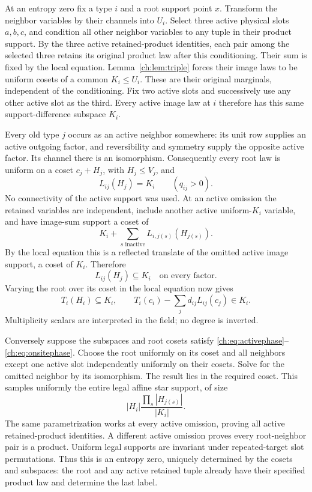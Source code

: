 At an entropy zero fix a type $i$ and a root support point $x$. Transform the neighbor variables by their channels into $U_i$. Select three active physical slots $a,b,c$, and condition all other neighbor variables to any tuple in their product support. By the three active retained-product identities, each pair among the selected three retains its original product law after this conditioning. Their sum is fixed by the local equation. Lemma~\ref{ch:lem:triple} forces their image laws to be uniform cosets of a common $K_i\le U_i$. These are their original marginals, independent of the conditioning. Fix two active slots and successively use any other active slot as the third. Every active image law at $i$ therefore has this same support-difference subspace $K_i$.

Every old type $j$ occurs as an active neighbor somewhere: its unit row supplies an active outgoing factor, and reversibility and symmetry supply the opposite active factor. Its channel there is an isomorphism. Consequently every root law is uniform on a coset $c_j+H_j$, with $H_j\le V_j$, and
\begin{equation}\label{ch:eq:activephase}
 L_{ij}(H_j)=K_i\qquad(q_{ij}>0).
\end{equation}
No connectivity of the active support was used. At an active omission the retained variables are independent, include another active uniform-$K_i$ variable, and have image-sum support a coset of
\[
 K_i+\sum_{s\text{ inactive}}L_{i,j(s)}(H_{j(s)}).
\]
By the local equation this is a reflected translate of the omitted active image support, a coset of $K_i$. Therefore
\begin{equation}\label{ch:eq:inactivephase}
 L_{ij}(H_j)\subseteq K_i\quad\text{on every factor}.
\end{equation}
Varying the root over its coset in the local equation now gives
\begin{equation}\label{ch:eq:onsitephase}
 T_i(H_i)\subseteq K_i,\qquad
 T_i(c_i)-\sum_jd_{ij}L_{ij}(c_j)\in K_i.
\end{equation}
Multiplicity scalars are interpreted in the field; no degree is inverted.

Conversely suppose the subspaces and root cosets satisfy \eqref{ch:eq:activephase}--\eqref{ch:eq:onsitephase}. Choose the root uniformly on its coset and all neighbors except one active slot independently uniformly on their cosets. Solve for the omitted neighbor by its isomorphism. The result lies in the required coset. This samples uniformly the entire legal affine star support, of size
\[
 |H_i|\frac{\prod_s|H_{j(s)}|}{|K_i|}.
\]
The same parametrization works at every active omission, proving all active retained-product identities. A different active omission proves every root-neighbor pair is a product. Uniform legal supports are invariant under repeated-target slot permutations. Thus this is an entropy zero, uniquely determined by the cosets and subspaces: the root and any active retained tuple already have their specified product law and determine the last label.

